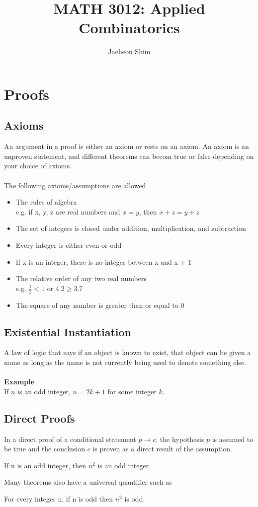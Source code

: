 \documentclass[12pt]{article}
\title{MATH 3012: Applied Combinatorics}
\author{Jaeheon Shim}
\date{}
\begin{document}
\pagestyle{fancy}

\maketitle
\thispagestyle{fancy}

\section{Proofs}
\subsection{Axioms}
An argument in a proof is either an axiom or rests on an axiom. An axiom is an unproven statement, and different theorems can becom true or false depending on your choice of axioms.\\\\
The following axioms/assumptions are allowed
\begin{itemize}
	\item The rules of algebra \\
		e.g. if x, y, z are real numbers and $x = y$, then $x + z = y + z$
	\item The set of integers is closed under addition, multiplication, and subtraction
	\item Every integer is either even or odd
	\item If x is an integer, there is no integer between x and x + 1
	\item The relative order of any two real numbers \\
		e.g. $\frac{1}{2} < 1$ or $4.2 \geq 3.7$
	\item The square of any number is greater than or equal to 0
\end{itemize}
\subsection{Existential Instantiation}
A law of logic that says if an object is known to exist, that object can be given a name as long as the name is not currently being used to denote something else. \\\\
\textbf{Example}\\
If $n$ is an odd integer, $n = 2k + 1$ for some integer $k$.
\subsection{Direct Proofs}
In a direct proof of a conditional statement $p \rightarrow c$, the hypothesis $p$ is assumed to be true and the conclusion $c$ is proven as a direct result of the assumption.
\begin{center}
	If n is an odd integer, then $n^2$ is an odd integer.
\end{center}
Many theorems also have a universal quantifier such as
\begin{center}
	For every integer n, if n is odd then $n^2$ is odd.
\end{center}
\end{document}
